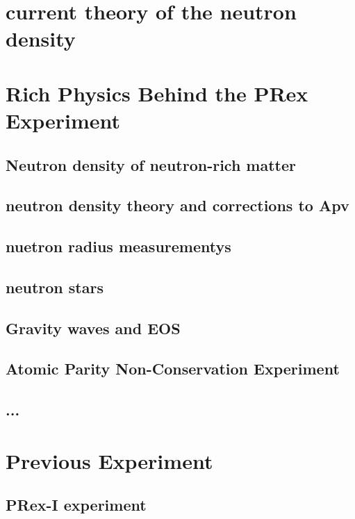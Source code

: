 \section{current theory of the neutron density}

\section{Rich Physics Behind the PRex Experiment}
\subsection{Neutron density of neutron-rich matter}
\subsection{neutron density theory and corrections to Apv}
\subsection{nuetron radius measurementys}
\subsection{neutron stars}
\subsection{Gravity waves and EOS}
\subsection{Atomic Parity Non-Conservation Experiment}
\subsection{...}
\section{Previous Experiment}
\subsection{PRex-I experiment}